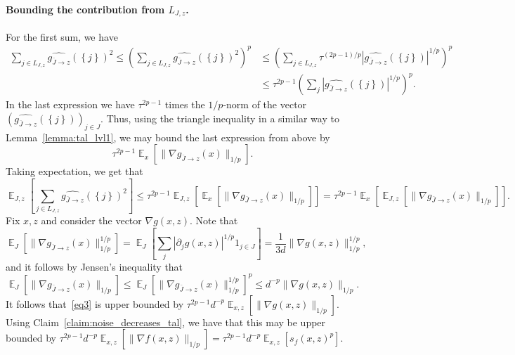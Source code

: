 \documentclass[10pt]{article}
\newcommand{\card}[1]{\left\lvert #1\right\rvert}
\newcommand{\set}[1]{{\left\{#1\right\}}}
\newcommand{\Expect}[2]{{\mathop{\mathbb E}_{#1}\left[#2\right]}}
\newcommand{\norm}[1]{\lVert #1\rVert}
\begin{document}
  \paragraph{Bounding the contribution from $L_{J,z}$.}
  For the first sum, we have
  \begin{align*}
  \sum\limits_{j\in L_{J,z}}\widehat{g_{\overline{J}\rightarrow z}}(\set{j})^2
  \leq
  \left(\sum\limits_{j\in L_{J,z}}\widehat{g_{\overline{J}\rightarrow z}}(\set{j})^2\right)^{p}
  &\leq \left(\sum\limits_{j\in L_{J,z}}\tau^{(2p-1)/p}\card{\widehat{g_{\overline{J}\rightarrow z}}(\set{j})}^{1/p}\right)^{p}\\
  &\leq \tau^{2p-1}\left(\sum\limits_{j}\card{\widehat{g_{\overline{J}\rightarrow z}}(\set{j})}^{1/p}\right)^{p}.
  \end{align*}
  In the last expression we have $\tau^{2p-1}$ times the $1/p$-norm of the vector $(\widehat{g_{\overline{J}\rightarrow z}}(\set{j}))_{j\in J}$.
  Thus, using the triangle inequality in a similar way to Lemma~\ref{lemma:tal_lvl1}, we may bound the last expression from above by
  \begin{equation}\label{eq3}
  \tau^{2p-1}\Expect{x}{\norm{\nabla{g_{\overline{J}\rightarrow z}}(x)}_{1/p}}.
  \end{equation}
  Taking expectation, we get that
  \[
  \Expect{J,z}{\sum\limits_{j\in L_{J,z}}\widehat{g_{\overline{J}\rightarrow z}}(\set{j})^2}
  \leq \tau^{2p-1}\Expect{J,z}{\Expect{x}{\norm{\nabla {g_{\overline{J}\rightarrow z}}(x)}_{1/p}}}
  = \tau^{2p-1}\Expect{x}{\Expect{J,z}{\norm{\nabla g_{\overline{J}\rightarrow z}(x)}_{1/p}}}.
  \]
  Fix $x,z$ and consider the vector $\nabla g(x,z)$.
  Note that
  \[
  \Expect{J}{\norm{\nabla g_{\overline{J}\rightarrow z}(x)}_{1/p}^{1/p}}
  =
  \Expect{J}{\sum\limits_{j}\card{\partial_j g(x,z)}^{1/p}1_{j\in J}}
  =\frac{1}{3d}\norm{\nabla g(x,z)}_{1/p}^{1/p},
  \]
  and it follows by Jensen's inequality that
  \[
  \Expect{J}{\norm{\nabla g_{\overline{J}\rightarrow z}(x)}_{1/p}}
  \leq
  \Expect{J}{\norm{\nabla g_{\overline{J}\rightarrow z}(x)}_{1/p}^{1/p}}^{p}
  \leq d^{-p} \norm{\nabla g(x,z)}_{1/p}.
  \]
  It follows that~\eqref{eq3} is upper bounded by $\tau^{2p-1}d^{-p}\Expect{x,z}{\norm{\nabla g(x,z)}_{1/p}}$.
  Using Claim~\ref{claim:noise_decreases_tal}, we have that this may be upper bounded by
  $\tau^{2p-1}d^{-p}\Expect{x,z}{\norm{\nabla f(x,z)}_{1/p}} = \tau^{2p-1}d^{-p} \Expect{x,z}{s_f(x,z)^p}$.
\end{document}
